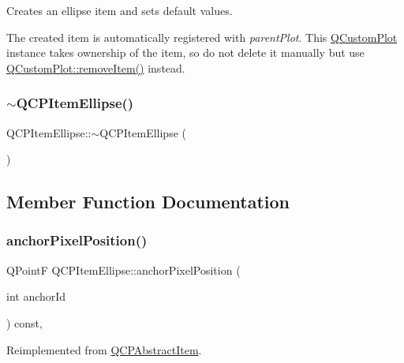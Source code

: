 Creates an ellipse item and sets default values.

The created item is automatically registered with {\itshape parent\+Plot}. This \mbox{\hyperlink{class_q_custom_plot}{Q\+Custom\+Plot}} instance takes ownership of the item, so do not delete it manually but use \mbox{\hyperlink{class_q_custom_plot_ae04446557292551e8fb6e2c106e1848d}{Q\+Custom\+Plot\+::remove\+Item()}} instead. \mbox{\label{class_q_c_p_item_ellipse_a3c17073a1805d32b4e09b6ccde0bef76}} 
\subsubsection{\texorpdfstring{$\sim$QCPItemEllipse()}{~QCPItemEllipse()}}
{\footnotesize\ttfamily Q\+C\+P\+Item\+Ellipse\+::$\sim$\+Q\+C\+P\+Item\+Ellipse (\begin{DoxyParamCaption}{ }\end{DoxyParamCaption})\hspace{0.3cm}{\ttfamily [virtual]}}



\subsection{Member Function Documentation}
\mbox{\label{class_q_c_p_item_ellipse_a35cd6983c61a16ac33c23f08dd2817cc}} 
\subsubsection{\texorpdfstring{anchorPixelPosition()}{anchorPixelPosition()}}
{\footnotesize\ttfamily Q\+PointF Q\+C\+P\+Item\+Ellipse\+::anchor\+Pixel\+Position (\begin{DoxyParamCaption}\item[{int}]{anchor\+Id }\end{DoxyParamCaption}) const\hspace{0.3cm}{\ttfamily [protected]}, {\ttfamily [virtual]}}



Reimplemented from \mbox{\hyperlink{class_q_c_p_abstract_item_ada5bad4e1196c4fc0d0d12328e24b8f2}{Q\+C\+P\+Abstract\+Item}}.

